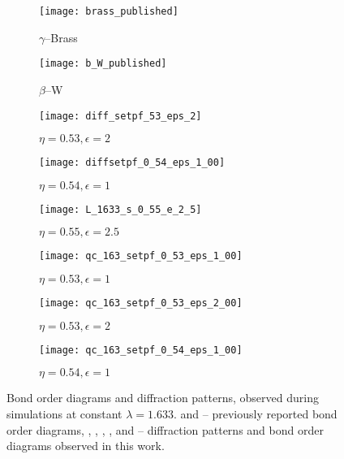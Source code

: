 \begin{figure}[H]
\centering
\begin{subfigure}{.24\textwidth}
  \centering
  \texttt{[image: brass\_published]}
  \caption{$\gamma$--Brass}
  \label{fig:brass_p} 
\end{subfigure}
\begin{subfigure}{.24\textwidth}
  \centering
   \texttt{[image: b\_W\_published]}
  \caption{$\beta$--W}
  \label{fig:betta_w}  
\end{subfigure}
\begin{subfigure}{.24\textwidth}
  \centering
  \texttt{[image: diff\_setpf\_53\_eps\_2]}
  \caption{$\eta=0.53,\epsilon=2$}
  \label{fig:diff_xz} 
\end{subfigure}
\begin{subfigure}{.24\textwidth}
  \centering
  \texttt{[image: diffsetpf\_0\_54\_eps\_1\_00]}
  \caption{$\eta=0.54,\epsilon=1$}
  \label{fig:diff_xz2} 
\end{subfigure}
\begin{subfigure}{.24\textwidth}
  \centering
  \texttt{[image: L\_1633\_s\_0\_55\_e\_2\_5]}
  \caption{$\eta=0.55,\epsilon=2.5$}
  \label{fig:brass_f} 
\end{subfigure}
\begin{subfigure}{.24\textwidth}
  \centering
   \texttt{[image: qc\_163\_setpf\_0\_53\_eps\_1\_00]}
  \caption{$\eta=0.53,\epsilon=1$}
  \label{fig:betta_w_f}  
\end{subfigure}
\begin{subfigure}{.24\textwidth}
  \centering
  \texttt{[image: qc\_163\_setpf\_0\_53\_eps\_2\_00]}
  \caption{$\eta=0.53,\epsilon=2$}
  \label{fig:bond_xz} 
\end{subfigure}
\begin{subfigure}{.24\textwidth}
  \centering
  \texttt{[image: qc\_163\_setpf\_0\_54\_eps\_1\_00]}
  \caption{$\eta=0.54,\epsilon=1$}
  \label{fig:bond_xz2} 
\end{subfigure}
\caption{Bond order diagrams and diffraction patterns, observed during simulations at constant $\lambda=1.633$.  and  -- previously reported bond order diagrams, , , , ,  and  -- diffraction patterns and bond order diagrams observed in this work.}
\label{fig:allfrom163}
\end{figure}


